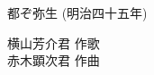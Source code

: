 ﻿\documentclass[10pt,a5j]{tarticle} %
\begin{document}
\thispagestyle{empty} %
\newcommand{\linespace}{1.0em} %
\newcommand{\blocksize}{0.33\hsize} %

\begin{minipage}[c]{0.7\hsize}
	\begin{center}
		{\LARGE
			都ぞ弥生
		}
		{\small 
			(明治四十五年)
		}\\
	\end{center}
\end{minipage}
\begin{minipage}[c]{0.3\hsize}
	\begin{flushright}%
		横山芳介君 作歌\\
		赤木顕次君 作曲
	\end{flushright}
\end{minipage}
\end{document}
